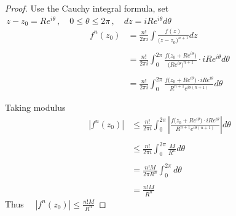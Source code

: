 \documentclass[11pt,a4paper]{article}
\theoremstyle{definition}
\begin{document}
\begin{proof}
Use the Cauchy integral formula, set $\, z - z_0 = Re^{i\theta}\, , \quad  0\leq \theta \leq 2\pi\,, \quad  dz = iRe^{i\theta}d\theta$
\begin{align*}
f^n(z_0) & = \frac{n!}{2\pi i}\int \frac{f(z)}{\big(z - z_0\big)^{n+1}}dz\\\\
& =  \frac{n!}{2\pi i}\int^{2\pi}_0\frac{f\Big(z_0 + Re^{i\theta}\Big)}{\Big(Re^{i\theta}\Big)^{n+1}}\cdot iRe^{i\theta}d\theta\\\\
& = \frac{n!}{2\pi i}\int^{2\pi}_0\frac{f\big(z_0 + Re^{i\theta}\big)\cdot iRe^{i\theta}}{R^{n + 1} e^{i\theta (n + 1)}} d\theta
\end{align*}

Taking modulus
\begin{align*}
\left|f^n(z_0)\right| & \leq \frac{n!}{2\pi i}\int^{2\pi}_0\left|\frac{f\big(z_0 + Re^{i\theta}\big)\cdot iRe^{i\theta}}{R^{n + 1} e^{i\theta (n + 1)}}\right|d\theta\\\\
& \leq \frac{n!}{2\pi i}\int^{2\pi}_0\frac{M}{R^n}d\theta\\\\
& = \frac{n!M}{2\pi R^n}\int^{2\pi}_0 d\theta\\\\
& = \frac{n!M}{R^n}
\end{align*}
Thus $\quad  \left|f^n(z_0)\right| \leq \frac{n!M}{R^n}$
\end{proof}
\end{document}
